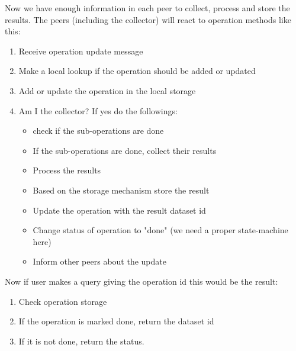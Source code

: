 Now we have enough information in each peer to collect, process and store the results. The peers (including the collector)
 will react to operation methods like this:

\begin{enumerate}
\item Receive operation update message
\item Make a local lookup if the operation should be added or updated
\item Add or update the operation in the local storage
\item Am I the collector? If yes do the followings:
\begin{itemize}
\item check if the sub-operations are done
\item If the sub-operations are done, collect their results
\item Process the results
\item Based on the storage mechanism store the result
\item Update the operation with the result dataset id
\item Change status of operation to "done" (we need a proper state-machine here)
\item Inform other peers about the update
\end{itemize}
\end{enumerate}

Now if user makes a query giving the operation id this would be the result:

\begin{enumerate}
\item Check operation storage
\item If the operation is marked done, return the dataset id
\item If it is not done, return the status.
\end{enumerate}
